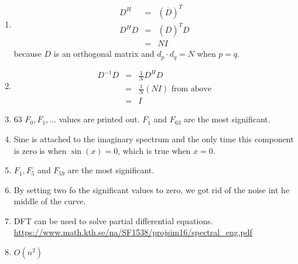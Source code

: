 \documentclass{article}
\begin{document}
\begin{enumerate}
\item 
\begin{eqnarray*}
	D^H &=& (\overline{D})^T\\
	D^HD &=& (\overline{D})^TD\\
	&=& NI
\end{eqnarray*}
because $D$ is an orthogonal matrix and $d_p \cdot d_q = N$ when $p=q$. 

\item 
\begin{eqnarray*}
	D^{-1}D &=& \frac{1}{N}D^HD\\
	&=& \frac{1}{N} (NI) \mbox{    from above}\\
	&=& I
\end{eqnarray*}


\item 63 $F_0, F_1, \dots$ values are printed out. $F_1$ and $F_63$ are the most significant. 

\item Sine is attached to the imaginary spectrum and the only time this component is zero is when $\sin{(x)} = 0$, which is true when $x=0$. 

\item $F_1, F_5$ and $F_59$ are the most significant.

\item By setting two fo the significant values to zero, we got rid of the noise int he middle of the curve. 

\item DFT can be used to solve partial differential equations. \url{https://www.math.kth.se/na/SF1538/projsim16/spectral_eng.pdf}

\item $O(n^2)$

\end{enumerate}
\end{document}
